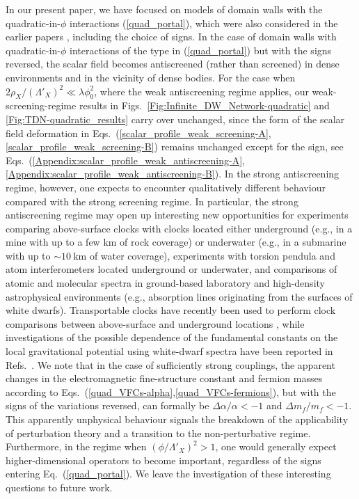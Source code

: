 \documentclass[aps,prd,onecolumn,nofootinbib]{revtex4-2} %
\begin{document}
In our present paper, we have focused on models of domain walls with the quadratic-in-$\phi$ interactions (\ref{quad_portal}), which were also considered in the earlier papers \cite{Derevianko_2014_TDM-clocks,Wcislo_2016_TDM-cavity,Roberts_2017_TDM-GPS,Wcislo_2018_TDM-cavity,Roberts_2019_TDM-clocks}, including the choice of signs. 
In the case of domain walls with quadratic-in-$\phi$ interactions of the type in (\ref{quad_portal}) but with the signs reversed, the scalar field becomes antiscreened (rather than screened) in dense environments and in the vicinity of dense bodies. 
For the case when $2 \rho_X / (\Lambda'_X)^2 \ll \lambda \phi_0^2$, where the weak antiscreening regime applies, our weak-screening-regime results in Figs.~\ref{Fig:Infinite_DW_Network-quadratic} and \ref{Fig:TDN-quadratic_results} carry over unchanged, since the form of the scalar field deformation in Eqs.~(\ref{scalar_profile_weak_screening-A},\ref{scalar_profile_weak_screening-B}) remains unchanged except for the sign, see Eqs.~(\ref{Appendix:scalar_profile_weak_antiscreening-A},\ref{Appendix:scalar_profile_weak_antiscreening-B}). 
In the strong antiscreening regime, however, one expects to encounter qualitatively different behaviour compared with the strong screening regime. 
In particular, the strong antiscreening regime may open up interesting new opportunities for experiments comparing above-surface clocks with clocks located either underground (e.g., in a mine with up to a few km of rock coverage) or underwater (e.g., in a submarine with up to $\sim 10~\textrm{km}$ of water coverage), experiments with torsion pendula and atom interferometers located underground or underwater, and comparisons of atomic and molecular spectra in ground-based laboratory and high-density astrophysical environments (e.g., absorption lines originating from the surfaces of white dwarfs). 
Transportable clocks have recently been used to perform clock comparisons between above-surface and underground locations \cite{Grotti_2018_UG-clocks}, while investigations of the possible dependence of the fundamental constants on the local gravitational potential using white-dwarf spectra have been reported in Refs.~\cite{Berengut_2013_WD-constants,Ubachs_2014_WD-constants,Webb_2020_WD-constants}. 
We note that in the case of sufficiently strong couplings, the apparent changes in the electromagnetic fine-structure constant and fermion masses according to Eqs.~(\ref{quad_VFCs-alpha},\ref{quad_VFCs-fermions}), but with the signs of the variations reversed, can formally be $\Delta \alpha / \alpha < -1$ and $\Delta m_f / m_f < -1$. 
This apparently unphysical behaviour signals the breakdown of the applicability of perturbation theory and a transition to the non-perturbative regime. 
Furthermore, in the regime when $(\phi / \Lambda'_X)^2 > 1$, one would generally expect higher-dimensional operators to become important, regardless of the signs entering Eq.~(\ref{quad_portal}). 
We leave the investigation of these interesting questions to future work. 
\end{document}
